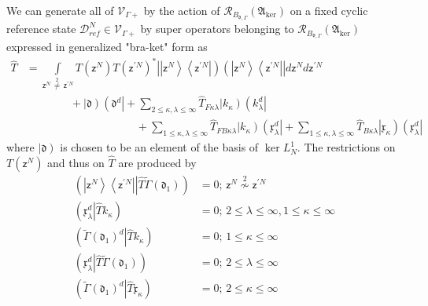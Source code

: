 \documentclass[aps,preprint]{revtex4}%
\begin{document}
We can generate all of $\mathcal{V}_{\Gamma+}$ by the action of $\mathcal{R}%
_{B_{\mathfrak{d},\Gamma}}\left(  \mathfrak{A}_{\ker}\right)  $ on a fixed
cyclic reference state $\mathcal{D}_{ref}^{N}\in\mathcal{V}_{\Gamma+}$ by
super operators belonging to $\mathcal{R}_{B_{\mathfrak{d},\Gamma}}\left(
\mathfrak{A}_{\ker}\right)  $ expressed in generalized "bra-ket" form as
\begin{align}
\hat{T}  &  =%
{\displaystyle\int\limits_{\mathsf{z}^{N}\,\overset{2}{\neq}\,\mathsf{z}%
^{\prime N}}}
T\left(  \mathsf{z}^{N}\right)  T\left(  \mathsf{z}^{\prime N}\right)  ^{\ast
}\left\vert \left\vert \mathsf{z}^{N}\right\rangle \left\langle \mathsf{z}%
^{\prime N}\right\vert \right)  \left(  \left\vert \mathsf{z}^{N}\right\rangle
\left\langle \mathsf{z}^{\prime N}\right\vert \right\vert d\mathsf{z}%
^{N}d\mathsf{z}^{\prime N}\nonumber\\
&  \qquad\qquad+\left\vert \mathfrak{d}\right)  \left(  \mathfrak{d}%
^{d}\right\vert +%
{\displaystyle\sum\limits_{2\leq\kappa,\lambda\leq\infty}}
\hat{T}_{F\kappa\lambda}\left\vert k_{\kappa}\right)  \left(  k_{\lambda}%
^{d}\right\vert \nonumber\\
&  \qquad\qquad\qquad\qquad\qquad+%
{\displaystyle\sum\limits_{1\leq\kappa,\lambda\leq\infty}}
\hat{T}_{FB\kappa\lambda}\left\vert k_{\kappa}\right)  \left(  \mathfrak{x}%
_{\lambda}^{d}\right\vert +%
{\displaystyle\sum\limits_{1\leq\kappa,\lambda\leq\infty}}
\hat{T}_{B\kappa\lambda}\left\vert \mathfrak{x}_{\kappa}\right)  \left(
\mathfrak{x}_{\lambda}^{d}\right\vert
\end{align}
where $\left\vert \mathfrak{d}\right)  $ is chosen to be an element of the
basis of $\ker L_{N}^{1}$. The restrictions on $T\left(  \mathsf{z}%
^{N}\right)  $ and thus on $\hat{T}$ are produced by%
\begin{align}
\left(  \left\vert \mathsf{z}^{N}\right\rangle \left\langle \mathsf{z}^{\prime
N}\right\vert \left\vert \hat{T}\right.  \tilde{\Gamma}\left(  \mathfrak{d}%
_{1}\right)  \right)   &  =0;\,\mathsf{z}^{N}\overset{2}{\nsim}\mathsf{z}%
^{\prime N}\nonumber\\
\left(  \mathfrak{x}_{\lambda}^{d}\left\vert \hat{T}\right.  k_{\kappa
}\right)   &  =0;\,2\leq\lambda\leq\infty,1\leq\kappa\leq\infty\nonumber\\
\left(  \tilde{\Gamma}\left(  \mathfrak{d}_{1}\right)  ^{d}\left\vert \hat
{T}\right.  k_{\kappa}\right)   &  =0;\,1\leq\kappa\leq\infty\nonumber\\
\left(  \mathfrak{x}_{\lambda}^{d}\left\vert \hat{T}\right.  \tilde{\Gamma
}\left(  \mathfrak{d}_{1}\right)  \right)   &  =0;\,2\leq\lambda\leq
\infty\nonumber\\
\left(  \tilde{\Gamma}\left(  \mathfrak{d}_{1}\right)  ^{d}\left\vert \hat
{T}\right.  \mathfrak{x}_{\kappa}\right)   &  =0;\,2\leq\kappa\leq
\infty\label{InterFib}%
\end{align}
\end{document}

